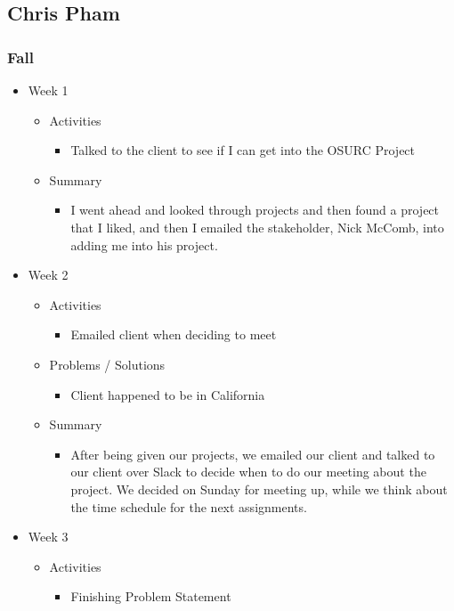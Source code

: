 \subsection{Chris Pham}
\subsubsection{Fall}
\begin{itemize}
\item Week 1
\begin{itemize}
\item Activities
\begin{itemize}
\item Talked to the client to see if I can get into the OSURC Project
\end{itemize}
\item Summary
\begin{itemize}
\item I went ahead and looked through projects and then found a project that I liked, and then I emailed the stakeholder, Nick McComb, into adding me into his project.
\end{itemize}
\end{itemize}
\item Week 2
\begin{itemize}
\item Activities
\begin{itemize}
\item Emailed client when deciding to meet
\end{itemize}
\item Problems / Solutions
\begin{itemize}
\item Client happened to be in California
\end{itemize}
\item Summary
\begin{itemize}
\item After being given our projects, we emailed our client and talked to our client over Slack to decide when to do our meeting about the project. We decided on Sunday for meeting up, while we think about the time schedule for the next assignments.
\end{itemize}
\end{itemize}
\item Week 3
\begin{itemize}
\item Activities
\begin{itemize}
\item Finishing Problem Statement

\end{itemize}
\end{itemize}
\end{itemize}

